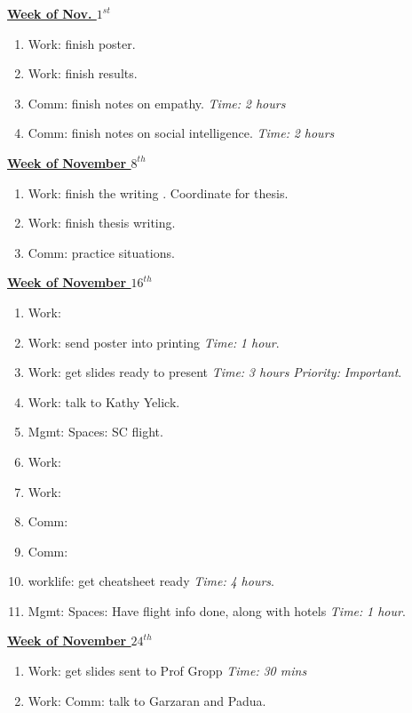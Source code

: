 \documentclass[serif, mathserif, final]{beamer}
\newcommand{\timeEst}[1]{\textit{Time:} \textit{#1}}
\newcommand{\priority}[1]{\textit{Priority:} \textit{#1}}
\begin{document}
{\begin{frame}{}
\begin{columns}
\begin{column}{0.5\linewidth}
\begin{block}{\small \underline{\textbf{Week of Nov. $1^{st}$}}}
\begin{enumerate}
\tiny \item \tiny Work: finish poster. 
\item \tiny Work: finish results. 
\item \tiny Comm: finish notes on empathy. \timeEst{2 hours} 
\item \tiny Comm: finish notes on social intelligence. \timeEst{2 hours} 
\end{enumerate}
\end{block}

\begin{block}{\small \underline{\textbf{Week of November $8^{th}$}}}
\begin{enumerate}
\tiny \item \tiny Work: finish the writing . Coordinate for thesis. 
\item \tiny  Work: finish thesis writing. 
\item \tiny  Comm: practice situations.
\end{enumerate}
\end{block}

\begin{block} {\small \underline{\textbf{Week of November $16^{th}$}} }
\begin{enumerate}
\tiny \item \tiny Work: 
\tiny \item \tiny Work: send poster into printing \timeEst{1 hour}. 
\item \tiny Work: get slides ready to present \timeEst{3 hours} \priority{Important}. 
\item \tiny Work: talk to Kathy Yelick. 
\item \tiny Mgmt: Spaces: SC flight. 
\item \tiny Work: 
\item \tiny Work: 
\item \tiny Comm: 
\item \tiny Comm: 
\item \tiny worklife: get cheatsheet ready \timeEst{4 hours}. 
\item \tiny Mgmt: Spaces: Have flight info done, along with hotels \timeEst{1 hour}. 
\end{enumerate}
\end{block} 


\begin{block} {\small \underline{\textbf{Week of November $24^{th}$}} }
\begin{enumerate}
\tiny \item \tiny Work: get slides sent to Prof Gropp \timeEst{30 mins} 
\tiny \item \tiny Work: Comm: talk to Garzaran and Padua. 


\end{enumerate}
\end{block}
\end{column}
\end{columns}
\end{frame}}
\end{document}
